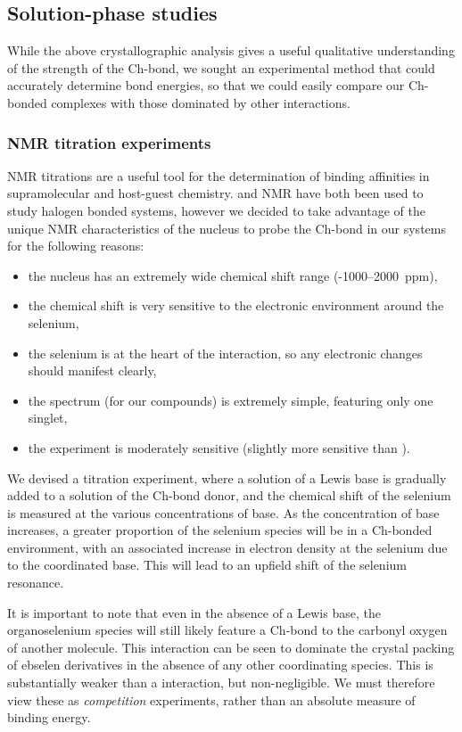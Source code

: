 \begin{refsection}
\subsection{Solution-phase studies}
While the above crystallographic analysis gives a useful qualitative understanding of the strength of the Ch-bond, we sought an experimental method that could accurately determine bond energies, so that we could easily compare our Ch-bonded complexes with those dominated by other interactions.

\subsubsection{NMR titration experiments}
NMR titrations are a useful tool for the determination of binding affinities in supramolecular and host-guest chemistry.
 and  NMR have both been used to study halogen bonded systems, however we decided to take advantage of the unique NMR characteristics of the  nucleus to probe the Ch-bond in our systems for the following reasons:

\begin{itemize}
    \item the nucleus has an extremely wide chemical shift range (-1000--2000~ppm),
    \item the chemical shift is very sensitive to the electronic environment around the selenium,
    \item the selenium is at the heart of the interaction, so any electronic changes should manifest clearly,
    \item the spectrum (for our compounds) is extremely simple, featuring only one singlet,
    \item the experiment is moderately sensitive (slightly more sensitive than ).
\end{itemize}

We devised a titration experiment, where a solution of a Lewis base is gradually added to a solution of the Ch-bond donor, and the chemical shift of the selenium is measured at the various concentrations of base.
As the concentration of base increases, a greater proportion of the selenium species will be in a Ch-bonded environment, with an associated increase in electron density at the selenium due to the coordinated base.
This will lead to an upfield shift of the selenium resonance.

It is important to note that even in the absence of a Lewis base, the organoselenium species will still likely feature a Ch-bond to the carbonyl oxygen of another molecule.
This interaction can be seen to dominate the crystal packing of ebselen derivatives in the absence of any other coordinating species.
This is substantially weaker than a  interaction, but non-negligible.
We must therefore view these as \emph{competition} experiments, rather than an absolute measure of binding energy.


\end{refsection}
